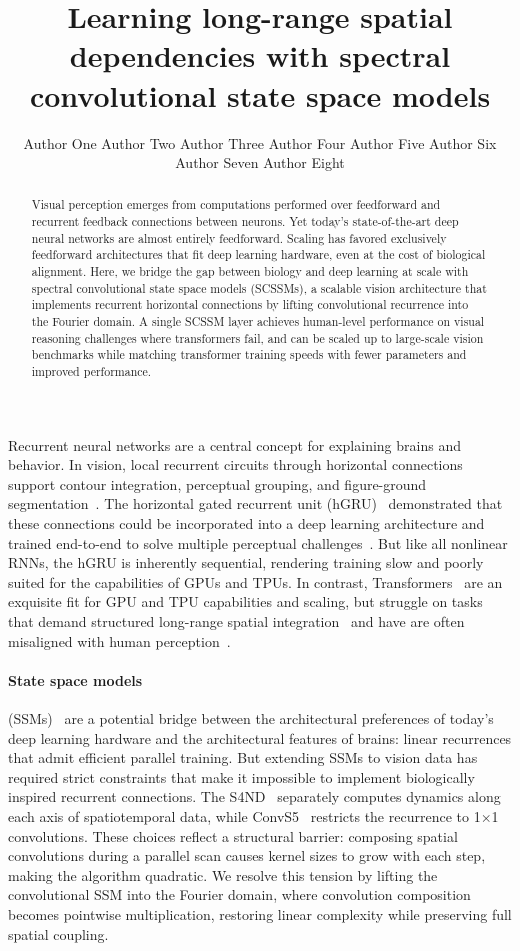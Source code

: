 \documentclass{ccn}  %
\title{Learning long-range spatial dependencies with spectral convolutional state space models}
\author{%
  Author One\affmark{1} \And
  Author Two\affmark{1} \And
  Author Three\affmark{2} \And
  Author Four\affmark{2,3} \AND
  Author Five\affmark{3} \And
  Author Six\affmark{4} \And
  Author Seven\affmark{4} \And
  Author Eight\affmark{1,4}%
}
\affiliation{1}{Department of Neuroscience, First University}
\affiliation{2}{Institute for Brain Research, Second University}
\affiliation{3}{Center for Neural Computation, Third University}
\affiliation{4}{Department of Psychology, Fourth University}
\begin{document}
\maketitle

\begin{abstract}
Visual perception emerges from computations performed over feedforward and recurrent feedback connections between neurons. Yet today's state-of-the-art deep neural networks are almost entirely feedforward. Scaling has favored exclusively feedforward architectures that fit deep learning hardware, even at the cost of biological alignment. Here, we bridge the gap between biology and deep learning at scale with spectral convolutional state space models (SCSSMs), a scalable vision architecture that implements recurrent horizontal connections by lifting convolutional recurrence into the Fourier domain. A single SCSSM layer achieves human-level performance on visual reasoning challenges where transformers fail, and can be scaled up to large-scale vision benchmarks while matching transformer training speeds with fewer parameters and improved performance.
\end{abstract}

Recurrent neural networks are a central concept for explaining brains and behavior. In vision, local recurrent circuits through horizontal connections support contour integration, perceptual grouping, and figure-ground segmentation~\citep{gilbert1989,bosking1997,field1993,gilbertli2013,mely2018}. The horizontal gated recurrent unit (hGRU)~\citep{linsley2018} demonstrated that these connections could be incorporated into a deep learning architecture and trained end-to-end to solve multiple perceptual challenges~\citep{linsley2020}. But like all nonlinear RNNs, the hGRU is inherently sequential, rendering training slow and poorly suited for the capabilities of GPUs and TPUs. In contrast, Transformers~\citep{vaswani2017} are an exquisite fit for GPU and TPU capabilities and scaling, but struggle on tasks that demand structured long-range spatial integration~\citep{tay2021} and have are often misaligned with human perception~\citep{Linsley2025-hz}.

\paragraph{State space models} (SSMs)~\citep{gu2022} are a potential bridge between the architectural preferences of today's deep learning hardware and the architectural features of brains: linear recurrences that admit efficient parallel training. But extending SSMs to vision data has required strict constraints that make it impossible to implement biologically inspired recurrent connections. The S4ND~\citep{nguyen2022} separately computes dynamics along each axis of spatiotemporal data, while ConvS5~\citep{smith2023convs5} restricts the recurrence to 1$\times$1 convolutions. These choices reflect a structural barrier: composing spatial convolutions during a parallel scan causes kernel sizes to grow with each step, making the algorithm quadratic. We resolve this tension by lifting the convolutional SSM into the Fourier domain, where convolution composition becomes pointwise multiplication, restoring linear complexity while preserving full spatial coupling.
\end{document}
